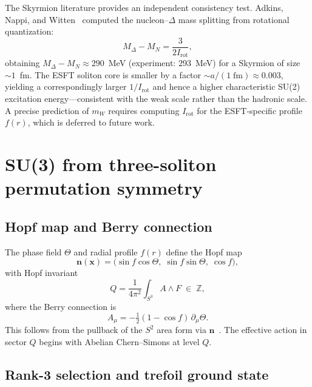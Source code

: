 \documentclass[a4paper,12pt]{article}
\begin{document}
The Skyrmion literature provides an independent consistency test.
Adkins, Nappi, and Witten~\cite{ANW1983} computed the
nucleon--$\Delta$ mass splitting from rotational quantization:
\begin{equation}
 M_\Delta - M_N = \frac{3}{2I_{\mathrm{rot}}},
\end{equation}
obtaining $M_\Delta - M_N \approx 290$~MeV (experiment: 293~MeV)
for a Skyrmion of size $\sim\!1$~fm. The ESFT soliton core is
smaller by a factor $\sim\!a/(1\;\mathrm{fm}) \approx 0.003$,
yielding a correspondingly larger $1/I_{\mathrm{rot}}$ and hence a
higher characteristic SU(2) excitation energy---consistent with the
weak scale rather than the hadronic scale. A precise prediction
of $m_W$ requires computing $I_{\mathrm{rot}}$ for the ESFT-specific
profile $f(r)$, which is deferred to future work.



\section{SU(3) from three-soliton permutation symmetry}
\label{sec:su3}

\subsection{Hopf map and Berry connection}
\label{sec:hopf}

The phase field $\Theta$ and radial profile $f(r)$ define the Hopf
map
\begin{equation}
\label{eq:hopfmap}
 \mathbf{n}(\mathbf{x}) = \bigl(\sin f\cos\Theta,\;
 \sin f\sin\Theta,\; \cos f\bigr),
\end{equation}
with Hopf invariant
\begin{equation}
\label{eq:hopfinvariant}
 Q = \frac{1}{4\pi^2}\int_{S^3} A \wedge F \;\in\; \mathbb{Z},
\end{equation}
where the Berry connection is
\begin{equation}
\label{eq:berry}
 A_\mu = -\tfrac{1}{2}(1-\cos f)\,\partial_\mu\Theta.
\end{equation}
This follows from the pullback of the $S^2$ area form via $\mathbf{n}$~\cite{Whitehead1947,Berry1984}. The effective
action in sector $Q$ begins with Abelian Chern--Simons at level $Q$.

\subsection{Rank-3 selection and trefoil ground state}
\end{document}
